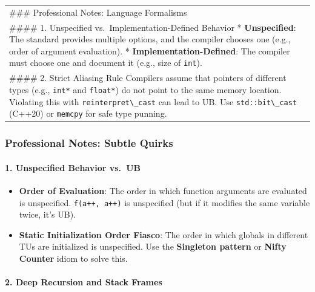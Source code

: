 \begin{longtable}[]{@{}
  >{\raggedright\arraybackslash}p{}@{}}
\toprule
\endhead
\#\#\# Professional Notes: Language Formalisms \\
\#\#\#\# 1. Unspecified vs.~Implementation-Defined Behavior *
\textbf{Unspecified}: The standard provides multiple options, and the
compiler chooses one (e.g., order of argument evaluation). *
\textbf{Implementation-Defined}: The compiler must choose one and
document it (e.g., size of \passthrough{\lstinline!int!}). \\
\#\#\#\# 2. Strict Aliasing Rule Compilers assume that pointers of
different types (e.g., \passthrough{\lstinline!int*!} and
\passthrough{\lstinline!float*!}) do not point to the same memory
location. Violating this with
\passthrough{\lstinline!reinterpret\_cast!} can lead to UB. Use
\passthrough{\lstinline!std::bit\_cast!} (C++20) or
\passthrough{\lstinline!memcpy!} for safe type punning. \\
\bottomrule
\end{longtable}

\hypertarget{professional-notes-subtle-quirks}{%
\subsubsection{Professional Notes: Subtle
Quirks}\label{professional-notes-subtle-quirks}}

\hypertarget{unspecified-behavior-vs.-ub}{%
\paragraph{1. Unspecified Behavior
vs.~UB}\label{unspecified-behavior-vs.-ub}}

\begin{itemize}
\tightlist
\item
  \textbf{Order of Evaluation}: The order in which function arguments
  are evaluated is unspecified. \passthrough{\lstinline!f(a++, a++)!} is
  unspecified (but if it modifies the same variable twice, it's UB).
\item
  \textbf{Static Initialization Order Fiasco}: The order in which
  globals in different TUs are initialized is unspecified. Use the
  \textbf{Singleton pattern} or \textbf{Nifty Counter} idiom to solve
  this.
\end{itemize}

\hypertarget{deep-recursion-and-stack-frames}{%
\paragraph{2. Deep Recursion and Stack
Frames}\label{deep-recursion-and-stack-frames}}

